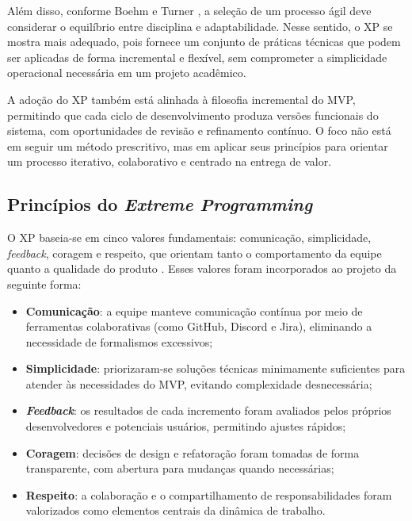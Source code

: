     Além disso, conforme Boehm e Turner \cite{boehm2003}, a seleção de um processo ágil deve considerar o equilíbrio entre disciplina e adaptabilidade. Nesse sentido, o XP se mostra mais adequado, pois fornece um conjunto de práticas técnicas que podem ser aplicadas de forma incremental e flexível, sem comprometer a simplicidade operacional necessária em um projeto acadêmico.

    A adoção do XP também está alinhada à filosofia incremental do MVP, permitindo que cada ciclo de desenvolvimento produza versões funcionais do sistema, com oportunidades de revisão e refinamento contínuo. O foco não está em seguir um método prescritivo, mas em aplicar seus princípios para orientar um processo iterativo, colaborativo e centrado na entrega de valor.

    \subsection{Princípios do \textit{Extreme Programming}}

        O XP baseia-se em cinco valores fundamentais: comunicação, simplicidade, \textit{feedback}, coragem e respeito, que orientam tanto o comportamento da equipe quanto a qualidade do produto \cite{beck2000, pressman2019}. Esses valores foram incorporados ao projeto da seguinte forma:

        \begin{itemize}
            \item \textbf{Comunicação}: a equipe manteve comunicação contínua por meio de ferramentas colaborativas (como GitHub, Discord e Jira), eliminando a necessidade de formalismos excessivos;
            \item \textbf{Simplicidade}: priorizaram-se soluções técnicas minimamente suficientes para atender às necessidades do MVP, evitando complexidade desnecessária;
            \item \textbf{\textit{Feedback}}: os resultados de cada incremento foram avaliados pelos próprios desenvolvedores e potenciais usuários, permitindo ajustes rápidos;
            \item \textbf{Coragem}: decisões de design e refatoração foram tomadas de forma transparente, com abertura para mudanças quando necessárias;
            \item \textbf{Respeito}: a colaboração e o compartilhamento de responsabilidades foram valorizados como elementos centrais da dinâmica de trabalho.
        \end{itemize}

